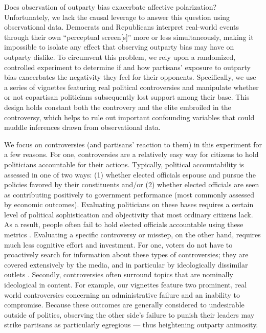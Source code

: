 \documentclass[12pt, letterpaper]{article}
\begin{document}
Does observation of outparty bias exacerbate affective polarization? Unfortunately, we lack the causal leverage to answer this question using observational data. Democrats and Republicans interpret real-world events through their own ``perceptual screen[s]'' \citep{campbell1960} more or less simultaneously, making it impossible to isolate any effect that observing outparty bias may have on outparty dislike. To circumvent this problem, we rely upon a randomized, controlled experiment to determine if and how partisans' exposure to outparty bias exacerbates the negativity they feel for their opponents. Specifically, we use a series of vignettes featuring real political controversies and manipulate whether or not copartisan politicians subsequently lost support among their base. This design holds constant both the controvery and the elite embroiled in the controversy, which helps to rule out important confounding variables that could muddle inferences drawn from observational data. 

We focus on controversies (and partisans' reaction to them) in this experiment for a few reasons. For one, controversies are a relatively easy way for citizens to hold politicians accountable for their actions. Typically, political accountability is assessed in one of two ways:  (1) whether elected officials espouse and pursue the policies favored by their constituents and/or (2) whether elected officials are seen as contributing positively to government performance (most commonly assessed by economic outcomes). Evaluating politicians on these bases requires a certain level of political sophistication and objectivity that most ordinary citizens lack. As a result, people often fail to hold elected officials accountable using these metrics \citep[e.g.,][]{achen2016democracy,Bartels2008,healylenz_2014,Lenz2012,snidermanstiglitz_2012,soodiyengar_2014}. Evaluating a specific controversy or misstep, on the other hand, requires much less cognitive effort and investment. For one, voters do not have to proactively search for information about these types of controversies; they are covered extensively by the media, and in particular by ideologically dissimilar outlets \citep{budaketal_2016,puglisisnyder_2011}. Secondly, controversies often surround topics that are nominally ideological in content. For example, our vignettes feature two prominent, real world controversies concerning an administrative failure and an inability to compromise. Because these outcomes are generally considered to undesirable outside of politics, observing the other side's failure to punish their leaders may strike partisans as particularly egregious --- thus heightening outparty animosity. 
\end{document}
